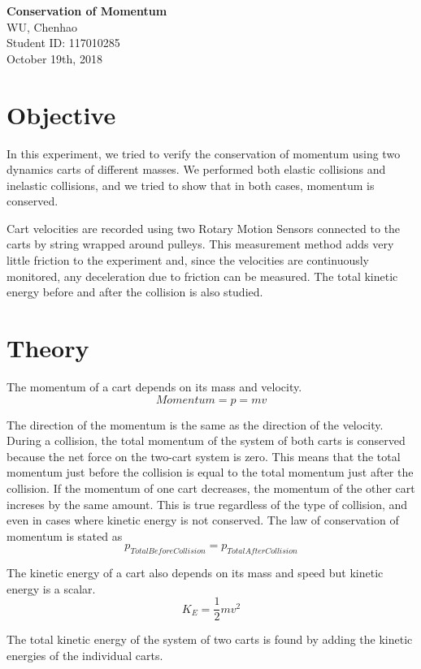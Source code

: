 \documentclass[12pt]{article}
\begin{document}
	\begin{titlepage}
		\begin{center}
			\Large\textbf{Conservation of Momentum}\\
			\Large\textmd{WU, Chenhao}\\
			\Large\textmd{Student ID: 117010285}\\
			\Large\textmd{October 19th, 2018}
		\end{center}
	\end{titlepage}

	\section{Objective}
	In this experiment, we tried to verify the conservation of momentum using two dynamics carts of different masses. We performed both elastic collisions and inelastic collisions, and we tried to show that in both cases, momentum is conserved.\par
	Cart velocities are recorded using two Rotary Motion Sensors connected to the carts by string wrapped around pulleys. This measurement method adds very little friction to the experiment and, since the velocities are continuously monitored, any deceleration due to friction can be measured. The total kinetic energy before and after the collision is also studied.
	
	\section{Theory}
	The momentum of a cart depends on its mass and velocity.
	\begin{equation}
		Momentum = p = mv
	\end{equation}\par
	The direction of the momentum is the same as the direction of the velocity. During a collision, the total momentum of the system of both carts is conserved because the net force on the two-cart system is zero. This means that the total momentum just before the collision is equal to the total momentum just after the collision. If the momentum of one cart decreases, the momentum of the other cart increses by the same amount. This is true regardless of the type of collision, and even in cases where kinetic energy is not conserved. The law of conservation of momentum is stated as
	\begin{equation}
		p_{TotalBeforeCollision} = p_{TotalAfterCollision}
	\end{equation}\par
	The kinetic energy of a cart also depends on its mass and speed but kinetic energy is a scalar.
	\begin{equation}
		K_E = \frac{1}{2}mv^{2}
	\end{equation}\par
	The total kinetic energy of the system of two carts is found by adding the kinetic energies of the individual carts.
	
\end{document}
